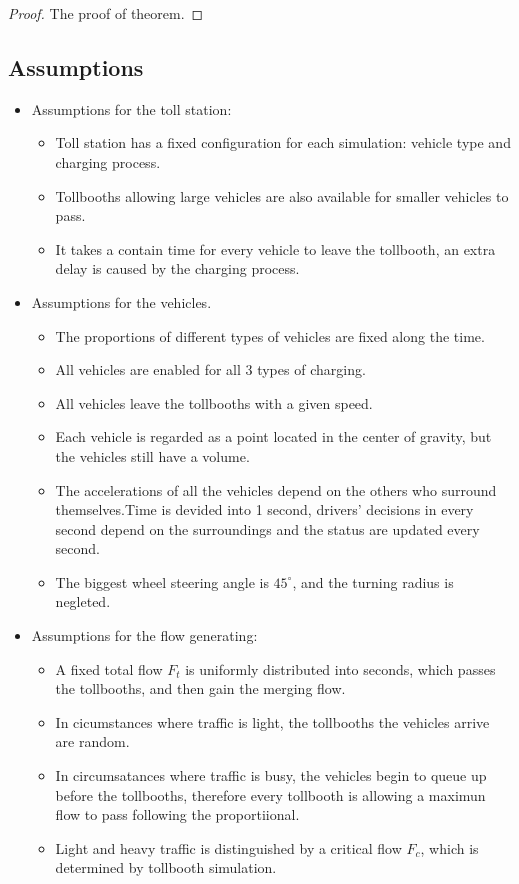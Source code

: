 \documentclass{mcmthesis}
\begin{document}
\begin{proof}
The proof of theorem.
\end{proof}

\subsection{Assumptions}

\begin{itemize}
	\item Assumptions for the toll station:
	\begin{itemize}
         \item Toll station has a fixed configuration for each simulation: vehicle type and charging process.
         \item Tollbooths allowing large vehicles are also available for smaller vehicles to pass.
       	 \item It takes a contain time for every vehicle to leave the tollbooth, an extra delay is caused by the charging process.
	\end{itemize}

    \item Assumptions for the vehicles.
    \begin{itemize}
    	\item The proportions of different types of vehicles are fixed along the time.
    	\item All vehicles are enabled for all 3 types of charging.
    	\item All vehicles leave the tollbooths with a given speed.
    	\item Each vehicle is regarded as a point located in the center of gravity, but the vehicles still have a volume.
    	\item The accelerations of all the vehicles depend on the others who surround themselves.Time is devided into 1 second, drivers' decisions in every second depend on the surroundings and the status are updated every second.
    	\item The biggest wheel steering angle is $45^{\circ}$, and the turning radius is negleted.
    	
    \end{itemize}
    \item Assumptions for the flow generating:
    \begin{itemize}
    \item A fixed total flow $F_t$ is uniformly distributed into seconds, which passes the tollbooths, and then gain the merging flow.
   	\item In cicumstances where traffic is light, the tollbooths the vehicles arrive are random.
    \item In circumsatances where traffic is busy, the vehicles begin to queue up before the tollbooths, therefore every tollbooth is allowing a maximun flow to pass following the proportiional.
    \item Light and heavy traffic is distinguished by a critical flow  $F_c$, which is determined by tollbooth simulation.
    \end{itemize}
	
	
\end{itemize}
\end{document}
